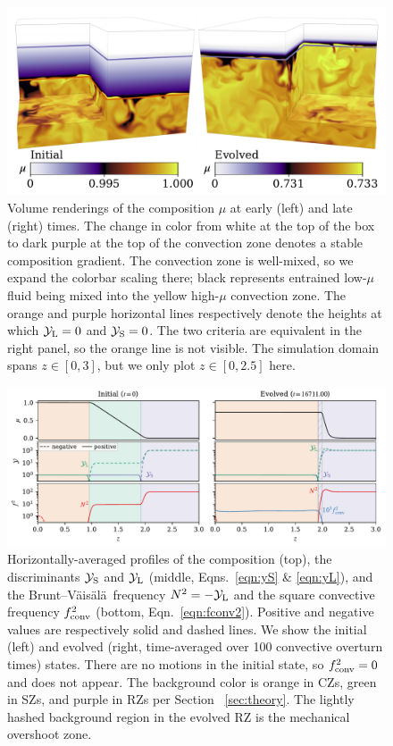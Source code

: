 \documentclass[twocolumn, linenumbers, twocolappendix]{aastex631}
\newcommand{\yL}{\ensuremath{\mathcal{Y}_{\rm{L}}}}
\newcommand{\yS}{\ensuremath{\mathcal{Y}_{\rm{S}}}}
\newcommand{\brunt}{{Brunt--V\"{a}is\"{a}l\"{a}}}
\begin{document}


\begin{figure}[t!]
\centering
\includegraphics[width=\textwidth]{dynamics_figure.pdf}
\caption{
    Volume renderings of the composition $\mu$ at early (left) and late (right) times.
    The change in color from white at the top of the box to dark purple at the top of the convection zone denotes a stable composition gradient.
    The convection zone is well-mixed, so we expand the colorbar scaling there; black represents entrained low-$\mu$ fluid being mixed into the yellow high-$\mu$ convection zone.
    The orange and purple horizontal lines respectively denote the heights at which $\yL = 0$ and $\yS = 0$.
    The two criteria are equivalent in the right panel, so the orange line is not visible.
    The simulation domain spans $z \in [0, 3]$, but we only plot $z \in [0, 2.5]$ here.
\label{fig:dynamics}
}
\end{figure}



\begin{figure}[t]
\centering
\includegraphics[width=\textwidth]{fig2_profiles.pdf}
\caption{
    Horizontally-averaged profiles of the composition (top), the discriminants $\yS$ and $\yL$ (middle, Eqns.~\ref{eqn:yS} \& \ref{eqn:yL}), and the \brunt$\,$ frequency $N^2 = -\yL$ and the square convective frequency $f_{\rm{conv}}^2$ (bottom, Eqn.~\ref{eqn:fconv2}).
    Positive and negative values are respectively solid and dashed lines.
    We show the initial (left) and evolved (right, time-averaged over 100 convective overturn times) states.
    There are no motions in the initial state, so $f_{\rm{conv}}^2 = 0$ and does not appear.
    The background color is orange in CZs, green in SZs, and purple in RZs per Section ~\ref{sec:theory}.
    The lightly hashed background region in the evolved RZ is the mechanical overshoot zone.
\label{fig:profiles}
}
\end{figure}
\end{document}
